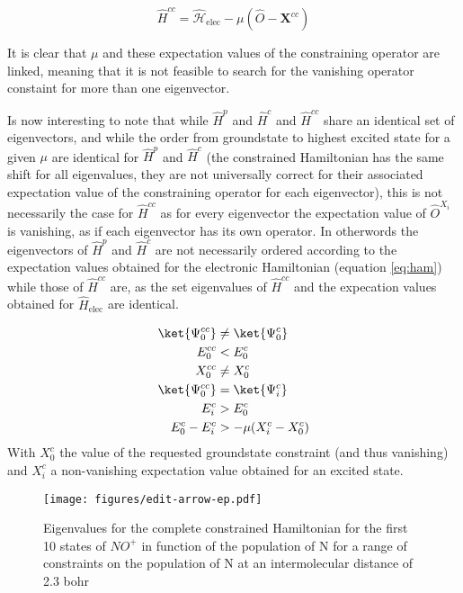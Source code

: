   \begin{equation}
    \hat{H}^{cc} = \hat{\mathcal{H}}_\text{elec}  - \mu (\hat{O} - \textbf{X}^{cc})
  \end{equation}

  It is clear that $\mu$ and these expectation values of the constraining operator are linked, meaning that it is not feasible to search for the vanishing operator constaint for more than one eigenvector.

  Is now interesting to note that while $\hat{H}^{p}$ and $\hat{H}^c$ and $\hat{H}^{cc}$ share an identical set of eigenvectors, and while the order from groundstate to highest excited state for a given $\mu$ are identical for $\hat{H}^{p}$ and $\hat{H}^c$ (the constrained Hamiltonian has the same shift for all eigenvalues, they are not universally correct for their associated expectation value of the constraining operator for each eigenvector), this is not necessarily the case for $\hat{H}^{cc}$ as for every eigenvector the expectation value of $\hat{O}^{X_i}$ is vanishing, as if each eigenvector has its own operator. In otherwords the eigenvectors of  $\hat{H}^{p}$ and $\hat{H}^c$ are not necessarily ordered according to the expectation values obtained for the electronic Hamiltonian (equation \ref{eq:ham}) while those of $\hat{H}^{cc}$ are, as the set eigenvalues of $\hat{H}^{cc}$ and the expecation values obtained for $\hat{H}_{\text{elec}}$ are identical.

  \begin{align}
    \ket{\Psi^{cc}_0} & \neq \ket{\Psi^{c}_0}  \\
    E^{cc}_0 &< E^{c}_0 \\
    X^{cc}_0 &\neq X^{c}_0 \\
    \ket{\Psi^{cc}_0} & = \ket{\Psi^{c}_i}  \\
    E^{c}_i &> E^{c}_0 \\
    E^{c}_0 - E^{c}_i &> - \mu (X^{c}_i - X^{c}_0)
  \end{align}
  With $X^{c}_0$ the value of the requested groundstate constraint (and thus vanishing) and $X^{c}_i$ a non-vanishing expectation value obtained for an excited state.

\begin{figure}[h!]
  \texttt{[image: figures/edit-arrow-ep.pdf]}
  \caption{Eigenvalues for the complete constrained Hamiltonian for the first 10 states of $NO^+$ in function of the population of N for a range of constraints on the population of N at an intermolecular distance of 2.3 bohr}
  \label{fig:complete}
\end{figure}

